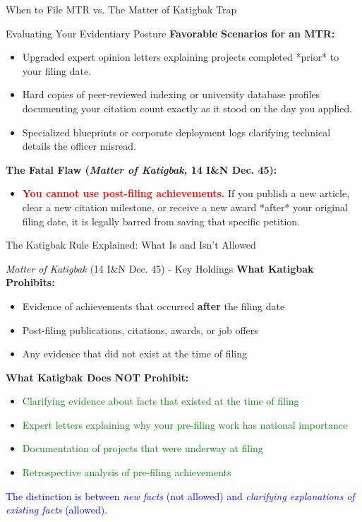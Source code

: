 \documentclass[11pt]{beamer}
\begin{document}
	\begin{frame}{When to File MTR vs. The Matter of Katigbak Trap}
		\scriptsize
		\begin{block}{Evaluating Your Evidentiary Posture}
			\textbf{Favorable Scenarios for an MTR:}
			\begin{itemize}
				\item Upgraded expert opinion letters explaining projects completed *prior* to your filing date.
				\item Hard copies of peer-reviewed indexing or university database profiles documenting your citation count exactly as it stood on the day you applied.
				\item Specialized blueprints or corporate deployment logs clarifying technical details the officer misread.
			\end{itemize}
			\textbf{The Fatal Flaw (\textit{Matter of Katigbak}, 14 I\&N Dec. 45):}
			\begin{itemize}
				\item \textcolor{red}{\textbf{You cannot use post-filing achievements.}} If you publish a new article, clear a new citation milestone, or receive a new award *after* your original filing date, it is legally barred from saving that specific petition.
			\end{itemize}
		\end{block}
	\end{frame}
	
	\begin{frame}{The Katigbak Rule Explained: What Is and Isn't Allowed}
		\scriptsize
		\begin{block}{\textit{Matter of Katigbak} (14 I\&N Dec. 45) - Key Holdings}
			\textbf{What Katigbak Prohibits:}
			\begin{itemize}
				\item Evidence of achievements that occurred \textbf{after} the filing date
				\item Post-filing publications, citations, awards, or job offers
				\item Any evidence that did not exist at the time of filing
			\end{itemize}
			\textbf{What Katigbak Does NOT Prohibit:}
			\begin{itemize}
				\item \textcolor{green}{Clarifying evidence about facts that existed at the time of filing}
				\item \textcolor{green}{Expert letters explaining why your pre-filing work has national importance}
				\item \textcolor{green}{Documentation of projects that were underway at filing}
				\item \textcolor{green}{Retrospective analysis of pre-filing achievements}
			\end{itemize}
			\textcolor{blue}{The distinction is between \textit{new facts} (not allowed) and \textit{clarifying explanations of existing facts} (allowed).}
		\end{block}
	\end{frame}
	
\end{document}
